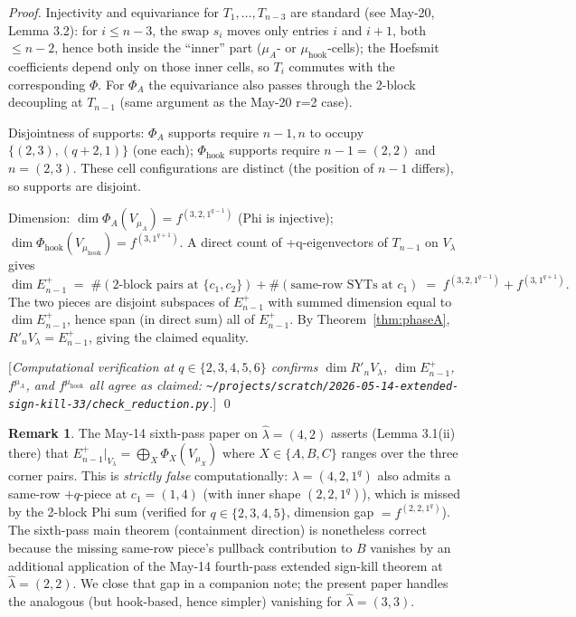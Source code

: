 \documentclass[11pt]{article}
\theoremstyle{definition}
\newtheorem{remark}[theorem]{Remark}
\newcommand{\hatl}{\widehat\lambda}
\begin{document}
\begin{proof}
Injectivity and equivariance for $T_1, \ldots, T_{n-3}$ are standard
(see May-20, Lemma 3.2): for $i \le n - 3$, the swap $s_i$ moves only
entries $i$ and $i+1$, both $\le n-2$, hence both inside the
``inner'' part ($\mu_A$- or $\mu_{\mathrm{hook}}$-cells); the
Hoefsmit coefficients depend only on those inner cells, so $T_i$
commutes with the corresponding $\Phi$.  For $\Phi_A$ the equivariance
also passes through the 2-block decoupling at $T_{n-1}$ (same argument
as the May-20 r=2 case).

Disjointness of supports: $\Phi_A$ supports require $n-1, n$ to occupy
$\{(2, 3), (q+2, 1)\}$ (one each); $\Phi_{\mathrm{hook}}$ supports
require $n-1 = (2, 2)$ and $n = (2, 3)$.  These cell configurations
are distinct (the position of $n-1$ differs), so supports are disjoint.

Dimension: $\dim \Phi_A(V_{\mu_A}) = f^{(3, 2, 1^{q-1})}$ (Phi is
injective); $\dim \Phi_{\mathrm{hook}}(V_{\mu_{\mathrm{hook}}}) = f^{(3, 1^{q+1})}$.
A direct count of +q-eigenvectors of $T_{n-1}$ on $V_\lambda$ gives
\[
   \dim E_{n-1}^+ \;=\; \#(\text{2-block pairs at } \{c_1, c_2\}) +
   \#(\text{same-row SYTs at } c_1)
   \;=\; f^{(3, 2, 1^{q-1})} + f^{(3, 1^{q+1})}.
\]
The two pieces are disjoint subspaces of $E_{n-1}^+$ with summed
dimension equal to $\dim E_{n-1}^+$, hence span (in direct sum) all
of $E_{n-1}^+$.  By Theorem~\ref{thm:phaseA}, $R'_n V_\lambda =
E_{n-1}^+$, giving the claimed equality.

[\textit{Computational verification at $q \in \{2,3,4,5,6\}$
confirms $\dim R'_n V_\lambda$, $\dim E_{n-1}^+$, $f^{\mu_A}$, and
$f^{\mu_{\mathrm{hook}}}$ all agree as claimed:
\texttt{\textasciitilde/projects/scratch/2026-05-14-extended-sign-kill-33/check\_reduction.py}.}]
\qed
\end{proof}

\begin{remark}\label{rem:42-gap}
The May-14 sixth-pass paper on $\hatl = (4, 2)$ asserts (Lemma 3.1(ii)
there) that $E_{n-1}^+|_{V_\lambda} = \bigoplus_X \Phi_X(V_{\mu_X})$
where $X \in \{A, B, C\}$ ranges over the three corner pairs.  This is
\emph{strictly false} computationally: $\lambda = (4, 2, 1^q)$ also
admits a same-row $+q$-piece at $c_1 = (1, 4)$ (with inner shape
$(2, 2, 1^q)$), which is missed by the 2-block Phi sum (verified for
$q \in \{2, 3, 4, 5\}$, dimension gap $= f^{(2, 2, 1^q)}$).  The
sixth-pass main theorem (containment direction) is nonetheless correct
because the missing same-row piece's pullback contribution to $B$
vanishes by an additional application of the May-14 fourth-pass
extended sign-kill theorem at $\hatl = (2, 2)$.  We close that gap in
a companion note; the present paper handles the analogous (but
hook-based, hence simpler) vanishing for $\hatl = (3, 3)$.
\end{remark}
\end{document}
